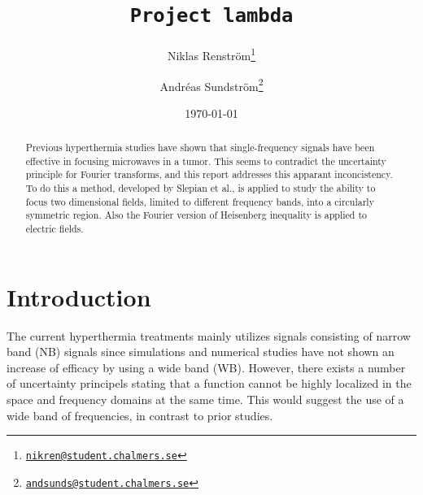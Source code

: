 \documentclass[11pt,a4paper, 
swedish,english %
]{article}
\begin{document}


%


\begin{titlepage}
\title{\tt Project lambda}
\author{Niklas Renström\footnote{\href{mailto:nikren@student.chalmers.se}{\tt nikren@student.chalmers.se}} 
\and Andréas Sundström\footnote{\href{mailto:andsunds@student.chalmers.se}{\tt andsunds@student.chalmers.se}}
}

\date{\today}

\maketitle


\thispagestyle{empty} \pagestyle{empty} %

\begin{abstract}
Previous hyperthermia studies have shown that single-frequency signals
have been effective in focusing microwaves in a tumor. This seems to 
contradict the uncertainty principle for Fourier transforms, and this
report addresses this apparant inconcistency. To do this a method,
developed by Slepian et al., is applied to study the ability to focus
two dimensional fields, limited to different frequency bands, into a
circularly symmetric region. Also the Fourier version of Heisenberg
inequality is applied to electric fields. 


\end{abstract}
\newpage
\tableofcontents
\end{titlepage}

\setcounter{page}{1}


\section{Introduction}

The current hyperthermia treatments mainly utilizes signals consisting of narrow band (NB) signals since simulations and numerical studies have not shown an increase of efficacy by using a wide band (WB). 
However, there exists a number of uncertainty principels stating that a function cannot be highly localized in the space and frequency domains at the same time. This would suggest the use of a wide band of frequencies, in contrast to prior studies.
\end{document}
